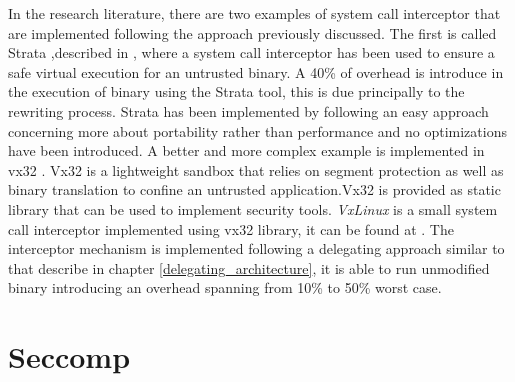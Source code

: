 In the research literature, there are two examples of system call interceptor that are implemented following the approach previously discussed. The first is called Strata ,described in \cite{Strata}, where a system call interceptor has been used to ensure a safe virtual execution for an untrusted binary.  A 40\% of overhead is introduce in the execution of binary using the Strata tool, this is due principally to the rewriting process.  Strata has been implemented by following an easy approach concerning more about portability rather than performance and no optimizations have been introduced. A better and more complex example is implemented in vx32 \cite{vx32}. Vx32 is a lightweight sandbox that relies on segment protection as well as binary translation to confine an untrusted application.Vx32 is provided as static library that can be used to implement security tools. \emph{VxLinux} is a small system call interceptor implemented using vx32 library, it can be found at \cite{soft:vx32}. The interceptor mechanism is implemented following a delegating approach similar to that describe in chapter \ref{delegating_architecture}, it is able to run unmodified binary introducing an overhead spanning from 10\% to 50\% worst case. 


\section{Seccomp}


